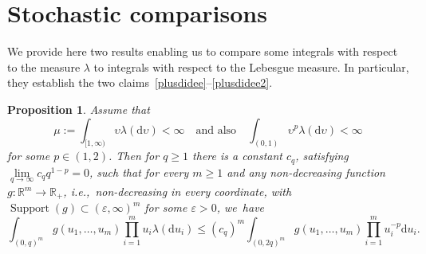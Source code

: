 \documentclass[11pt]{article}
\newcommand{\ie}{i.e.,\xspace}
\numberwithin{equation}{section}
\newtheorem{proposition}[theorem]{Proposition}
\theoremstyle{definition}
\newcommand{\dd}{\mathrm{d}}
\DeclareMathOperator*{\supp}{\mathrm{Support}}
\newcommand{\bbR}{{\ensuremath{\mathbb R}} }
\let\gep\varepsilon
\let\ups\upsilon
\begin{document}
\section{Stochastic comparisons}

We provide here
two results enabling us to compare some integrals
with respect to the measure $\lambda$ to integrals with respect
to the Lebesgue measure.
In particular, they establish the two claims~\eqref{plusdidee}--\eqref{plusdidee2}.

\begin{proposition}
\label{prop:compare1}
Assume that
\[
\mu:=\int_{[1,\infty)} \ups \lambda(\dd \ups) <\infty\quad\text{and also}\quad \int_{(0,1)} \ups^p \lambda(\dd \ups) <\infty
\]
for some $p \in (1,2)$. Then for $q\geq 1$ there is
a constant $c_q$, satisfying $\lim\limits_{q\to\infty} c_q q^{1-p} =0$,
such that for every $m\geq 1$ and any non-decreasing function $g:\bbR^m \to \bbR_+$, \ie \ non-decreasing in every coordinate, with $\supp(g)\subset (\gep,\infty)^m$ for some $\gep>0$, we~have
\[
\int_{(0,q)^m} g(u_1, \ldots, u_m) \prod_{i=1}^m u_i \lambda(\dd u_i) \leq (c_q)^m \int_{(0,2q)^m} g(u_1, \ldots, u_m) \prod_{i=1}^m u_i^{-p} \dd u_i.
\]
\end{proposition}
\end{document}
